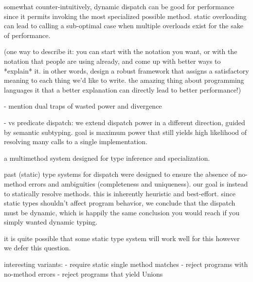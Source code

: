 somewhat counter-intuitively, dynamic dispatch can be good for performance
since it permits invoking the most specialized possible method.
static overloading can lead to calling a sub-optimal case when multiple
overloads exist for the sake of performance.


(one way to describe it: you can start with the notation you want, or with the
notation that people are using already, and come up with better ways to
*explain* it.
in other words, design a robust framework that assigns a satisfactory meaning
to each thing we'd like to write.
the amazing thing about programming languages it that a better
explanation can directly lead to better performance!)



- mention dual traps of wasted power and divergence


- vs predicate dispatch: we extend dispatch power in a different direction,
guided by semantic subtyping. goal is maximum power that still yields high
likelihood of resolving many calls to a single implementation.

a multimethod system designed for type inference and specialization.

past (static) type systems for dispatch were designed to ensure the absence of
no-method errors and ambiguities (completeness and uniqueness). our goal
is instead to statically resolve methods. this is inherently heuristic and
best-effort. since static types shouldn't affect program behavior, we
conclude that the dispatch must be dynamic, which is happily the same
conclusion you would reach if you simply wanted dynamic typing.


it is quite possible that some static type system will work well for this
however we defer this question.

interesting variants:
- require static single method matches
- reject programs with no-method errors
- reject programs that yield Unions






